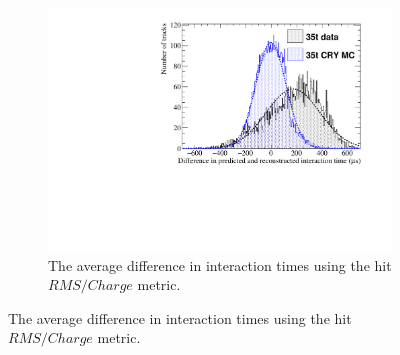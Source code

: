 \begin{figure}
  \centering
  \begin{subfigure}{0.6\textwidth}
    \centering
    \includegraphics[width=\textwidth]{Overlay_AvTimeDiff_RMS_Int}
    \caption{The average difference in interaction times using the hit $RMS/Charge$ metric.}
    \label{fig:DiffOverlayAvDiff_RMS_Int_T}
  \end{subfigure}


\end{figure}
